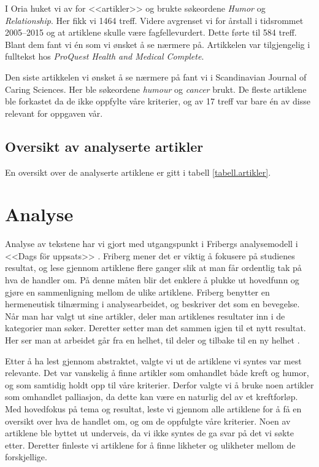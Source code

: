 I Oria huket vi av for <<artikler>> og brukte søkeordene \textit{Humor} og
\textit{Relationship}. Her fikk vi 1464 treff. Videre avgrenset vi for årstall
i tidsrommet 2005--2015 og at artiklene skulle være fagfellevurdert. Dette
førte til 584 treff. Blant dem fant vi én som vi ønsket å se nærmere på.
Artikkelen var tilgjengelig i fulltekst hos \textit{ProQuest Health and Medical
Complete}.

Den siste artikkelen vi ønsket å se nærmere på fant vi i Scandinavian Journal
of Caring Sciences. Her ble søkeordene \textit{humour} og \textit{cancer}
brukt. De fleste artiklene ble forkastet da de ikke oppfylte våre kriterier, og
av 17 treff var bare én av disse relevant for oppgaven vår.

\subsection{Oversikt av analyserte artikler}

En oversikt over de analyserte artiklene er gitt i tabell
\vref{tabell.artikler}.



\section{Analyse}

Analyse av tekstene har vi gjort med utgangspunkt i Fribergs analysemodell i
<<Dags för uppsats>> \citeyear{friberg2006}. Friberg mener det er viktig å
fokusere på studienes resultat, og lese gjennom artiklene flere ganger slik at
man får ordentlig tak på hva de handler om. På denne måten blir det enklere å
plukke ut hovedfunn og gjøre en sammenligning mellom de ulike artiklene.
Friberg benytter en hermeneutisk tilnærming i analysearbeidet, og beskriver det
som en bevegelse. Når man har valgt ut sine artikler, deler man artiklenes
resultater inn i de kategorier man søker. Deretter setter man det sammen igjen
til et nytt resultat. Her ser man at arbeidet går fra en helhet, til deler og
tilbake til en ny helhet \cite[s.~110]{friberg2006}.

Etter å ha lest gjennom abstraktet, valgte vi ut de artiklene vi syntes var
mest relevante. Det var vanskelig å finne artikler som omhandlet både kreft og
humor, og som samtidig holdt opp til våre kriterier. Derfor valgte vi å bruke
noen artikler som omhandlet palliasjon, da dette kan være en naturlig del av et
kreftforløp. Med hovedfokus på tema og resultat, leste vi gjennom alle
artiklene for å få en oversikt over hva de handlet om, og om de oppfulgte våre
kriterier. Noen av artiklene ble byttet ut underveis, da vi ikke syntes de ga
svar på det vi søkte etter. Deretter finleste vi artiklene for å finne likheter
og ulikheter mellom de forskjellige.

